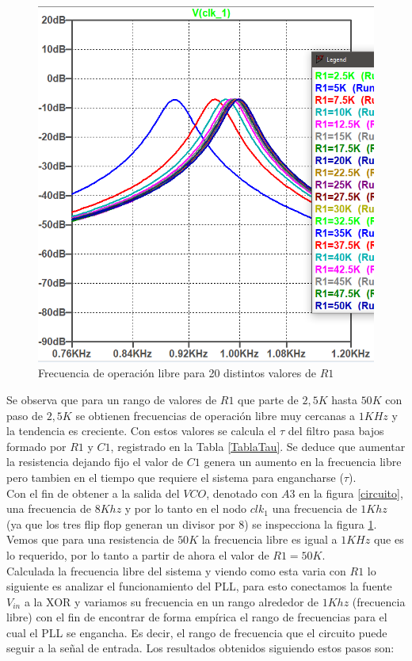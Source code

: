 \documentclass[10pt,a4paper]{IEEEtran}
\begin{document}
\begin{figure}[H]
    \centering
    \includegraphics[width=.45\textwidth]{Fig/FrecuenciaLibreVariandoR50K}
    \caption{Frecuencia de operación libre para 20 distintos valores de $R1$}
    \label{RBarrido}
\end{figure}
Se observa que para un rango de valores de $R1$ que parte de $2,5K$ hasta $50K$ con paso de $2,5K$ se obtienen frecuencias de operación libre 
muy cercanas a $1KHz$ y la tendencia es creciente. Con estos valores se calcula el $\tau$ del filtro pasa bajos formado por 
$R1$ y $C1$, registrado en la Tabla \ref{TablaTau}. Se deduce que aumentar la resistencia dejando fijo el valor de $C1$ genera un aumento 
en la frecuencia libre pero tambien en el tiempo que requiere el sistema para engancharse ($\tau$).\\
Con el fin de obtener a la salida del $VCO$, denotado con $A3$ en la figura \ref{circuito}, una frecuencia de $8Khz$ y por lo tanto en el nodo 
$clk_1$ una frecuencia de $1Khz$ (ya que los tres flip flop generan un divisor por 8) se inspecciona la figura \ref{RBarrido}. Vemos que para 
una resistencia de $50K$ la frecuencia libre es igual a $1KHz$ que es lo requerido, por lo tanto a partir de ahora el valor de $R1=50K$.\\
Calculada la frecuencia libre del sistema y viendo como esta varia con $R1$ lo siguiente es analizar el funcionamiento del PLL, para esto conectamos 
la fuente $V_{in}$ a la XOR y variamos su frecuencia en un rango alrededor de $1Khz$ (frecuencia libre) con el fin de encontrar de forma empírica el rango
de frecuencias para el cual el PLL se engancha. Es decir, el rango de frecuencia que el circuito puede seguir a la señal de entrada. Los resultados obtenidos siguiendo estos 
pasos son:
\end{document}
